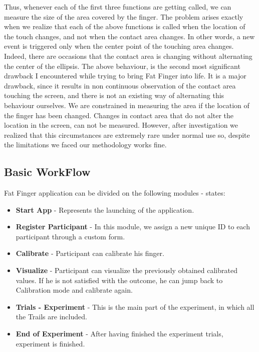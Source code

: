 Thus, whenever each of the first three functions are getting called, we can measure the size of the area covered by the finger. The problem arises exactly when we realize that each of the above functions is called when the location of the touch changes, and not when the contact area changes. In other words, a new event is triggered only when the center point of the touching area changes. Indeed, there are occasions that the contact area is changing without alternating the center of the ellipsis. 
The above behaviour, is the second most significant drawback I encountered while trying to bring Fat Finger into life. It is a major drawback, since it results in non continuous observation of the contact area touching the screen, and there is not an existing way of alternating this behaviour ourselves. We are constrained in measuring the area if the location of the finger has been changed. Changes in contact area that do not alter the location in the screen, can not be measured. However, after investigation we realized that this circumstances are extremely rare under normal use so, despite the limitations we faced our methodology works fine.


\subsection{Basic WorkFlow}
 
 Fat Finger application can be divided on the following modules - states:

 \begin{itemize}
\item \textbf{Start App} - Represents the launching of the application. 
\item \textbf{Register Participant} - In this module, we assign a new unique ID to each participant through a custom form.
\item \textbf{Calibrate} - Participant can calibrate his finger.
\item \textbf{Visualize} - Participant can visualize the previously obtained calibrated values. If he is not satisfied with the outcome, he can jump back to Calibration mode and calibrate again.
\item \textbf{Trials - Experiment} - This is the main part of the experiment, in which all the Trails are included.
\item \textbf{End of Experiment} - After having finished the experiment trials, experiment is finished.
 \end{itemize}

